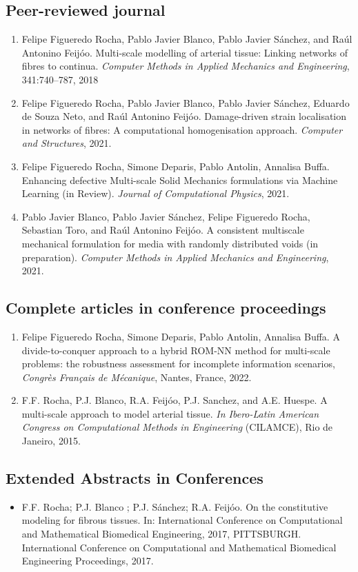 \documentclass[french]{article}
\begin{document}
\subsection{Peer-reviewed journal}
\begin{enumerate}
	\item Felipe Figueredo Rocha, Pablo Javier Blanco, Pablo Javier Sánchez, and Raúl Antonino Feijóo. Multi-scale modelling of arterial tissue: Linking networks of fibres to continua. \textit{Computer Methods in Applied Mechanics and Engineering}, 341:740–787, 2018
	\item Felipe Figueredo Rocha, Pablo Javier Blanco, Pablo Javier Sánchez, Eduardo de Souza Neto, and Raúl Antonino Feijóo. Damage-driven strain localisation in networks of fibres: A computational homogenisation approach. \textit{Computer and Structures}, 2021.
	\item Felipe Figueredo Rocha, Simone Deparis, Pablo Antolin, Annalisa Buffa.  Enhancing defective Multi-scale Solid Mechanics formulations via Machine Learning (in Review). \textit{Journal of Computational Physics}, 2021.
	\item Pablo Javier Blanco, Pablo Javier Sánchez, Felipe Figueredo Rocha, Sebastian Toro, and Raúl Antonino Feijóo. A consistent multiscale mechanical formulation for media with randomly distributed voids (in preparation). \textit{Computer Methods in Applied Mechanics and Engineering}, 2021.
	
\end{enumerate}	
\subsection{Complete articles in conference proceedings} 
\begin{enumerate}
	\item Felipe Figueredo Rocha, Simone Deparis, Pablo Antolin, Annalisa Buffa. 
	A divide-to-conquer approach to a hybrid ROM-NN
	method for multi-scale problems: the robustness
	assessment for incomplete information scenarios, \textit{Congrès Français de Mécanique}, Nantes, France, 2022.
	\item F.F. Rocha, P.J. Blanco, R.A. Feijóo, P.J. Sanchez, and A.E. Huespe. A multi-scale approach to model arterial tissue. \textit{In Ibero-Latin American Congress on Computational Methods in Engineering} (CILAMCE), Rio
	de Janeiro, 2015.
\end{enumerate}	
\subsection{Extended Abstracts in Conferences}
\begin{itemize}
	\item F.F. Rocha; P.J. Blanco ; P.J. Sánchez; R.A. Feijóo. On the constitutive modeling for fibrous tissues. In: International Conference on Computational and Mathematical Biomedical Engineering, 2017, PITTSBURGH. International Conference on Computational and Mathematical Biomedical Engineering Proceedings, 2017.
\end{itemize}
\end{document}
